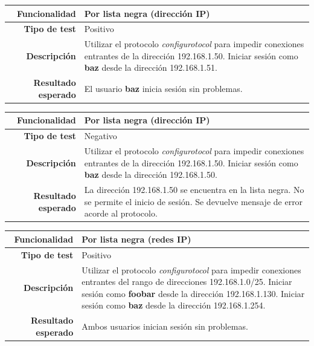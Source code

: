 \documentclass[a4paper,10pt]{article}
\begin{document}
\begin{center}
  \begin{tabular}{|r|p{12.5cm}|}
    \hline
    \textbf{Funcionalidad}	&	Por lista negra (dirección IP)\\
    \hline
    \textbf{Tipo de test}	&	Positivo\\
    \hline
    \textbf{Descripción}	&	Utilizar el protocolo \textit{configurotocol} para impedir conexiones
					entrantes de la dirección 192.168.1.50. Iniciar sesión como
					\textbf{baz} desde la dirección 192.168.1.51.\\
    \hline
    \textbf{Resultado esperado}	&	El usuario \textbf{baz} inicia sesión sin problemas.\\
    \hline   
  \end{tabular}
\end{center}

\begin{center}
  \begin{tabular}{|r|p{12.5cm}|}
    \hline
    \textbf{Funcionalidad}	&	Por lista negra (dirección IP)\\
    \hline
    \textbf{Tipo de test}	&	Negativo\\
    \hline
    \textbf{Descripción}	&	Utilizar el protocolo \textit{configurotocol} para impedir conexiones
					entrantes de la dirección 192.168.1.50. Iniciar sesión como
					\textbf{baz} desde la dirección 192.168.1.50.\\
    \hline
    \textbf{Resultado esperado}	&	La dirección 192.168.1.50 se encuentra en la lista negra. No se permite
					el inicio de sesión. Se devuelve mensaje de error acorde al protocolo.\\
    \hline   
  \end{tabular}
\end{center}

\begin{center}
  \begin{tabular}{|r|p{12.5cm}|}
    \hline
    \textbf{Funcionalidad}	&	Por lista negra (redes IP)\\
    \hline
    \textbf{Tipo de test}	&	Positivo\\
    \hline
    \textbf{Descripción}	&	Utilizar el protocolo \textit{configurotocol} para impedir conexiones
					entrantes del rango de direcciones 192.168.1.0/25. Iniciar sesión como
					\textbf{foobar} desde la dirección 192.168.1.130. Iniciar sesión como
					\textbf{baz} desde la dirección 192.168.1.254.\\
    \hline
    \textbf{Resultado esperado}	&	Ambos usuarios inician sesión sin problemas.\\
    \hline   
  \end{tabular}
\end{center}
\end{document}
